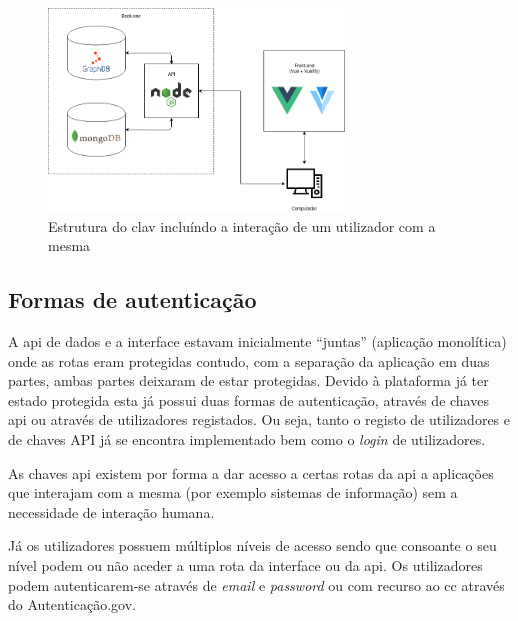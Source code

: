 \begin{figure}[H]
    \begin{center}
        \includegraphics[width=0.7\textwidth]{img/clav_struct.png}
    \end{center}
    \caption{Estrutura do \acrshort{clav} incluíndo a interação de um utilizador com a mesma}
    \label{fig:clav_struct}
\end{figure}

\subsection{Formas de autenticação}
A \acrshort{api} de dados e a interface estavam inicialmente ``juntas'' (aplicação monolítica) onde as rotas eram protegidas contudo, com a separação da aplicação em duas partes, ambas partes deixaram de estar protegidas. Devido à plataforma já ter estado protegida esta já possui duas formas de autenticação, através de chaves \acrshort{api} ou através de utilizadores registados. Ou seja, tanto o registo de utilizadores e de chaves API já se encontra implementado bem como o \textit{login} de utilizadores.

As chaves \acrshort{api} existem por forma a dar acesso a certas rotas da \acrshort{api} a aplicações que interajam com a mesma (por exemplo sistemas de informação) sem a necessidade de interação humana.

Já os utilizadores possuem múltiplos níveis de acesso sendo que consoante o seu nível podem ou não aceder a uma rota da interface ou da \acrshort{api}. Os utilizadores podem autenticarem-se através de \textit{email} e \textit{password} ou com recurso ao \acrfull{cc} através do Autenticação.gov.

